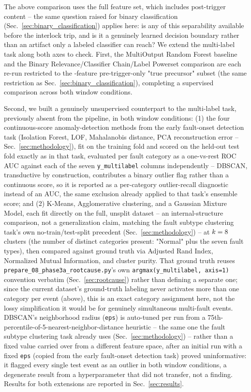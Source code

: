 The above comparison uses the full feature set, which includes post-trigger content -- the same question raised for binary classification (Sec.~\ref{sec:binary_classification}) applies here: is any of this separability available before the interlock trip, and is it a genuinely learned decision boundary rather than an artifact only a labeled classifier can reach? We extend the multi-label task along both axes to check. First, the MultiOutput Random Forest baseline and the Binary Relevance/Classifier Chain/Label Powerset comparison are each re-run restricted to the \MetricZeroSixbPhaseOneBinaryPretriggerNFeatures{}-feature pre-trigger-only "true precursor" subset (the same restriction as Sec.~\ref{sec:binary_classification}), completing a supervised comparison across both window conditions.

Second, we built a genuinely unsupervised counterpart to the multi-label task, previously absent from the pipeline, in both window conditions: (1) the four continuous-score anomaly-detection methods from the early fault-onset detection task (Isolation Forest, LOF, Mahalanobis distance, PCA reconstruction error -- Sec.~\ref{sec:methodology}), fit on the training fold and scored on the held-out test fold exactly as in that task, evaluated per fault category as a one-vs-rest ROC AUC against each of the seven \texttt{y\_multilabel} columns independently -- DBSCAN, transductive by construction, contributes a binary outlier flag rather than a continuous score, so it is reported as a per-category outlier-recall diagnostic instead of an AUC, the same exclusion already applied to that task's ensemble score; and (2) K-Means, Agglomerative clustering, and a Gaussian Mixture Model, each fit directly on the full, unsplit dataset -- an internal-structure comparison, not a generalization claim, matching the fault subtype clustering task's own no-train/test-split precedent (Sec.~\ref{sec:methodology}) -- at $k=8{}$ clusters (the number of distinct categories present: "Normal" plus the seven fault types), then compared against ground truth via Adjusted Rand Index, Normalized Mutual Information, and cluster purity. That ground truth reuses \texttt{prepare\_08\_phase3a\_rootcause.py}'s own \texttt{argmax(y\_multilabel, axis=1)} convention verbatim (Sec.~\ref{sec:rootcause}) rather than defining a separate one; since the current dataset's ground-truth labeling never activates more than one category per event (above), this is an exact category assignment here, not the lossy simplification it would be for genuinely simultaneous multi-fault events. DBSCAN's neighborhood radius (\texttt{eps}) is auto-tuned per run from a 75th-percentile-of-5-nearest-neighbor-distance heuristic -- the same one the fault subtype clustering task already uses (Sec.~\ref{sec:methodology}) -- rather than a fixed value carried over from a different feature space, after an initial run with a fixed \texttt{eps} (copied from the early fault-onset detection task) proved uninformative: it flagged every single test event as an outlier in both window conditions, a degenerate result from a hyperparameter that did not transfer, not a finding. Results for both extensions are reported in Sec.~\ref{sec:results}. %
